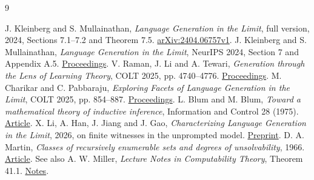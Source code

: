 \documentclass[11pt]{article}
\begin{document}
\begin{thebibliography}{9}\small\raggedright
{} J. Kleinberg and S. Mullainathan, \emph{Language Generation in the Limit}, full version, 2024, Sections 7.1--7.2 and Theorem 7.5. \href{https://arxiv.org/pdf/2404.06757v1}{arXiv:2404.06757v1}.
 J. Kleinberg and S. Mullainathan, \emph{Language Generation in the Limit}, NeurIPS 2024, Section 7 and Appendix A.5. \href{https://proceedings.neurips.cc/paper_files/paper/2024/hash/7988e9b3876ad689e921ce05d711442f-Abstract-Conference.html}{Proceedings}.
 V. Raman, J. Li and A. Tewari, \emph{Generation through the Lens of Learning Theory}, COLT 2025, pp. 4740--4776. \href{https://proceedings.mlr.press/v291/raman25a.html}{Proceedings}.
 M. Charikar and C. Pabbaraju, \emph{Exploring Facets of Language Generation in the Limit}, COLT 2025, pp. 854--887. \href{https://proceedings.mlr.press/v291/charikar25a.html}{Proceedings}.
 L. Blum and M. Blum, \emph{Toward a mathematical theory of inductive inference}, Information and Control 28 (1975). \href{https://doi.org/10.1016/S0019-9958(75)90261-2}{Article}.
 X. Li, A. Han, J. Jiang and J. Gao, \emph{Characterizing Language Generation in the Limit}, 2026, on finite witnesses in the unprompted model. \href{https://arxiv.org/abs/2609.10525}{Preprint}.
 D. A. Martin, \emph{Classes of recursively enumerable sets and degrees of unsolvability}, 1966. \href{https://doi.org/10.1002/malq.19660120125}{Article}. See also A. W. Miller, \emph{Lecture Notes in Computability Theory}, Theorem 41.1. \href{https://people.math.wisc.edu/~awmille1/old/m773-07/cmpthy.pdf}{Notes}.
\end{thebibliography}
\end{document}
